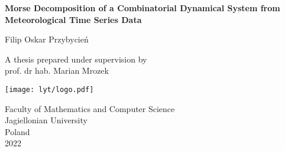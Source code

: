 \begin{titlepage}
\begin{center}
\vspace*{1cm}

\Large
\textbf{Morse Decomposition of a Combinatorial Dynamical System from Meteorological Time Series Data}

\vspace{2.0cm}

Filip Oskar Przybycień

\vfill
\large
A thesis prepared under supervision by\\
prof. dr hab. Marian Mrozek

\vspace{0.8cm}

\texttt{[image: lyt/logo.pdf]}

\large
Faculty of Mathematics and Computer Science\\
Jagiellonian University\\
Poland\\
2022

\end{center}
\end{titlepage}

